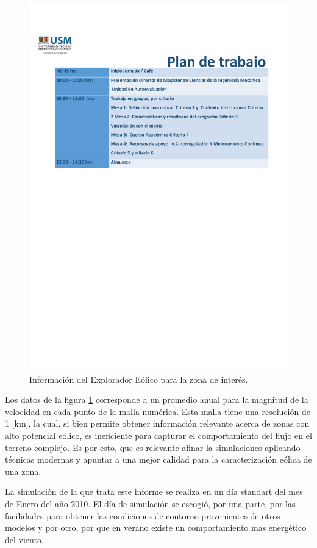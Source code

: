 \begin{figure}[H]
	\centering
	\includegraphics[width=0.9\linewidth,trim={5.4cm 2cm 15cm 5.5cm},clip]{Imagenes/explorador}
	\caption{Información del Explorador Eólico para la zona de interés.}
	\label{fig:explorador}
\end{figure}

Los datos de la figura \ref{fig:explorador} corresponde a un promedio anual para la magnitud de la velocidad en cada punto de la malla numérica. Esta malla tiene una resolución de 1 [km], la cual, si bien permite obtener información relevante acerca de zonas con alto potencial eólico, es ineficiente para capturar el comportamiento del flujo en el terreno complejo. Es por esto, que es relevante afinar la simulaciones aplicando técnicas modernas y apuntar a una mejor calidad para la caracterización eólica de una zona.

La simulación de la que trata este informe se realiza en un día standart del mes de Enero del año 2010. El día de simulación se escogió, por una parte, por las facilidades para obtener las condiciones de contorno provenientes de otros modelos y por otro, por que en verano existe un comportamiento mas energético del viento.
